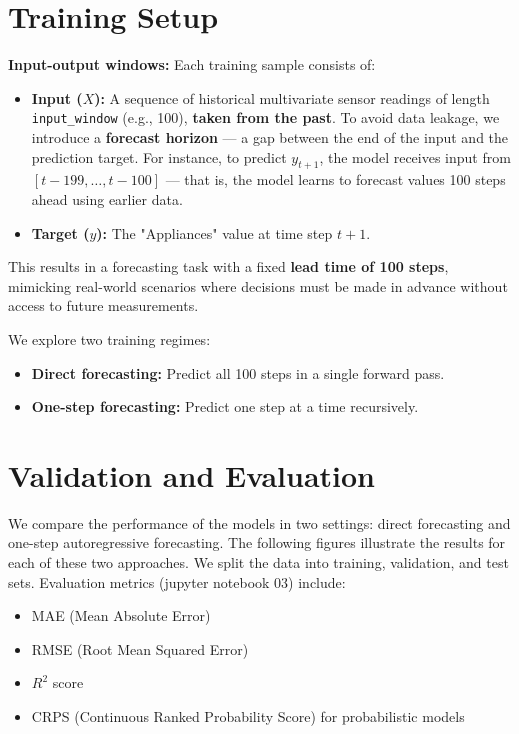 \documentclass{article}
\begin{document}
\section{Training Setup}
\textbf{Input-output windows:} Each training sample consists of:
\begin{itemize}
  \item \textbf{Input ($X$):} A sequence of historical multivariate sensor readings of length \texttt{input\_window} (e.g., 100), \textbf{taken from the past}. To avoid data leakage, we introduce a \textbf{forecast horizon} — a gap between the end of the input and the prediction target. For instance, to predict $y_{t+1}$, the model receives input from $[t - 199, \dots, t - 100]$ — that is, the model learns to forecast values 100 steps ahead using earlier data.
  \item \textbf{Target ($y$):} The "Appliances" value at time step $t + 1$.
\end{itemize}

This results in a forecasting task with a fixed \textbf{lead time of 100 steps}, mimicking real-world scenarios where decisions must be made in advance without access to future measurements.

We explore two training regimes:
\begin{itemize}
  \item \textbf{Direct forecasting:} Predict all 100 steps in a single forward pass.
  \item \textbf{One-step forecasting:} Predict one step at a time recursively.
\end{itemize}

\section{Validation and Evaluation}

We compare the performance of the models in two settings: direct forecasting and one-step autoregressive forecasting. The following figures illustrate the results for each of these two approaches. We split the data into training, validation, and test sets. Evaluation metrics (jupyter notebook 03) include:
\begin{itemize}
  \item MAE (Mean Absolute Error)
  \item RMSE (Root Mean Squared Error)
  \item $R^2$ score
  \item CRPS (Continuous Ranked Probability Score) for probabilistic models
\end{itemize}
\end{document}
